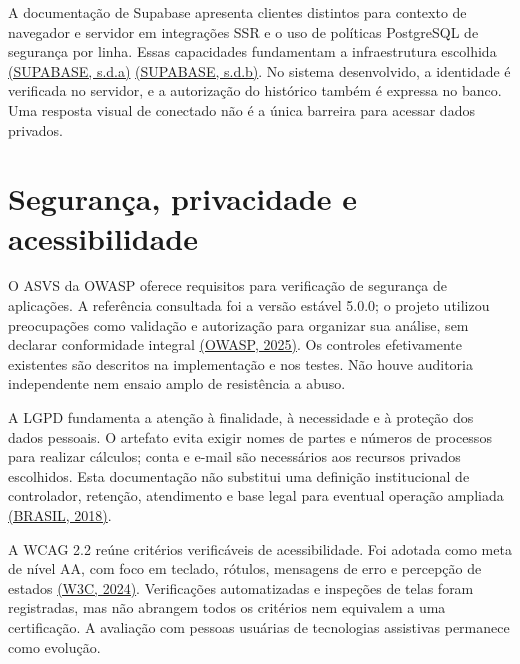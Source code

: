A documentação de Supabase apresenta clientes distintos para contexto de navegador e servidor em integrações SSR e o uso de políticas PostgreSQL de segurança por linha. Essas capacidades fundamentam a infraestrutura escolhida \hyperref[ref:SUPABASESSR]{(SUPABASE, s.d.a)} \hyperref[ref:SUPABASERLS]{(SUPABASE, s.d.b)}. No sistema desenvolvido, a identidade é verificada no servidor, e a autorização do histórico também é expressa no banco. Uma resposta visual de conectado não é a única barreira para acessar dados privados.

\section{Segurança, privacidade e acessibilidade}
\label{section-2-5}
O ASVS da OWASP oferece requisitos para verificação de segurança de aplicações. A referência consultada foi a versão estável 5.0.0; o projeto utilizou preocupações como validação e autorização para organizar sua análise, sem declarar conformidade integral \hyperref[ref:ASVS]{(OWASP, 2025)}. Os controles efetivamente existentes são descritos na implementação e nos testes. Não houve auditoria independente nem ensaio amplo de resistência a abuso.

A LGPD fundamenta a atenção à finalidade, à necessidade e à proteção dos dados pessoais. O artefato evita exigir nomes de partes e números de processos para realizar cálculos; conta e e-mail são necessários aos recursos privados escolhidos. Esta documentação não substitui uma definição institucional de controlador, retenção, atendimento e base legal para eventual operação ampliada \hyperref[ref:LGPD]{(BRASIL, 2018)}.

A WCAG 2.2 reúne critérios verificáveis de acessibilidade. Foi adotada como meta de nível AA, com foco em teclado, rótulos, mensagens de erro e percepção de estados \hyperref[ref:WCAG]{(W3C, 2024)}. Verificações automatizadas e inspeções de telas foram registradas, mas não abrangem todos os critérios nem equivalem a uma certificação. A avaliação com pessoas usuárias de tecnologias assistivas permanece como evolução.
